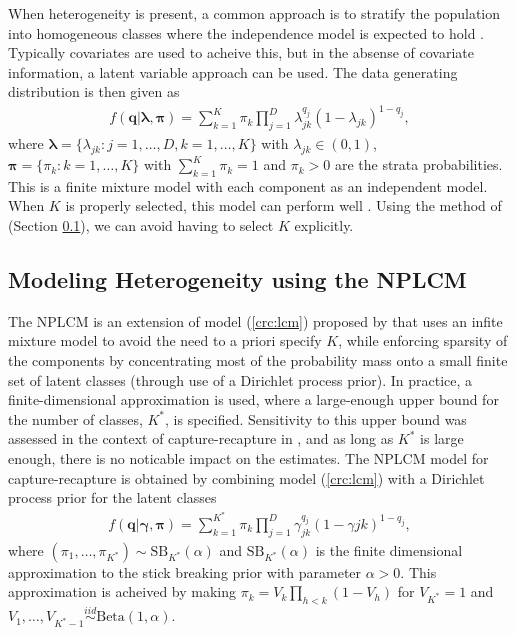 \documentclass[11pt]{article}\usepackage[]{graphicx}\usepackage[]{color}
\begin{document}
When heterogeneity is present, a common approach is to stratify the population into homogeneous classes where the independence model is expected to hold \citep{fienberg1972multiple}. Typically covariates are used to acheive this, but in the absense of covariate information, a latent variable approach can be used. The data generating distribution is then given as
\begin{align}
f(\boldsymbol q | \boldsymbol \lambda, \boldsymbol \pi) = \sum\limits_{k = 1}^K \pi_k \prod\limits_{j = 1}^D \lambda_{jk}^{q_j}(1-\lambda_{jk})^{1-q_j},
\label{crc:lcm}
\end{align}
where $\boldsymbol \lambda = \{\lambda_{jk}: j = 1, \dots, D, k = 1, \dots, K\}$ with $\lambda_{jk} \in (0,1)$, $\boldsymbol \pi = \{\pi_{k}: k = 1, \dots, K\}$ with $\sum_{k = 1}^K \pi_k = 1$ and $\pi_k > 0$ are the strata probabilities. This is a finite mixture model with each component as an independent model. When $K$ is properly selected, this model can perform well \citep{vermunt2008multiple}. Using the method of \citep{manrique2016bayesian} (Section \ref{sec:nplcm}), we can avoid having to select $K$ explicitly.

\subsection{Modeling Heterogeneity using the NPLCM}
\label{sec:nplcm}

The NPLCM is an extension of model (\ref{crc:lcm}) proposed by \citep{dunson2009nonparametric} that uses an infite mixture model to avoid the need to a priori specify $K$, while enforcing sparsity of the components by concentrating most of the probability mass onto a small finite set of latent classes (through use of a Dirichlet process prior). In practice, a finite-dimensional approximation is used, where a large-enough upper bound for the number of classes, $K^*$, is specified. Sensitivity to this upper bound was assessed in the context of capture-recapture in \citep{manrique2016bayesian}, and as long as $K^*$ is large enough, there is no noticable impact on the estimates. The NPLCM model for capture-recapture is obtained by combining model (\ref{crc:lcm}) with a Dirichlet process prior for the latent classes
\begin{align*}
f(\boldsymbol q | \boldsymbol \gamma, \boldsymbol \pi) = \sum\limits_{k = 1}^{K^*} \pi_k \prod\limits_{j = 1}^D \gamma_{jk}^{q_j}(1-\gamma{jk})^{1-q_j},
\end{align*}
where $(\pi_1, \dots, \pi_{K^*}) \sim \text{SB}_{K^*}(\alpha)$ and $\text{SB}_{K^*}(\alpha)$ is the finite dimensional approximation to the stick breaking prior with parameter $\alpha > 0$. This approximation is acheived by making $\pi_k = V_k\prod_{h < k}(1-V_h)$ for $V_{K^*} = 1$ and $V_1, \dots, V_{K^* - 1} \stackrel{iid}{\sim} \text{Beta}(1, \alpha)$.
\end{document}
